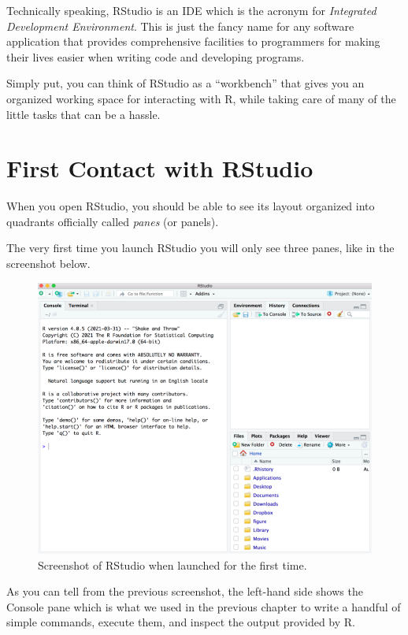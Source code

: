 \documentclass[
]{book}
\begin{document}
Technically speaking, RStudio is an IDE which is the acronym for
\emph{Integrated Development Environment}. This is just the fancy name for any
software application that provides comprehensive facilities to programmers for
making their lives easier when writing code and developing programs.

Simply put, you can think of RStudio as a ``workbench'' that gives you an
organized working space for interacting with R, while taking care of many of
the little tasks that can be a hassle.

\hypertarget{first-contact-with-rstudio}{%
\section{First Contact with RStudio}\label{first-contact-with-rstudio}}

When you open RStudio, you should be able to see its layout organized into
quadrants officially called \emph{panes} (or panels).

The very first time you launch RStudio you will only see three panes, like in
the screenshot below.

\begin{figure}

{\centering \includegraphics[width=0.7\linewidth]{images/rstudio/rstudio-launch-first-time} 

}

\caption{Screenshot of RStudio when launched for the first time.}\label{fig:unnamed-chunk-26}
\end{figure}

As you can tell from the previous screenshot, the left-hand side shows the
Console pane which is what we used in the previous chapter to write a handful
of simple commands, execute them, and inspect the output provided by R.
\end{document}
